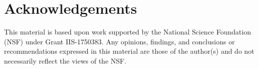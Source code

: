 \documentclass{article}
\begin{document}
\section{Acknowledgements}

This material is based upon work supported by the National Science Foundation (NSF) under Grant IIS-1750383. Any opinions, findings, and conclusions or recommendations expressed in this material are those of the author(s) and do not necessarily reflect the views of the NSF.

\balance

 
\end{document}
